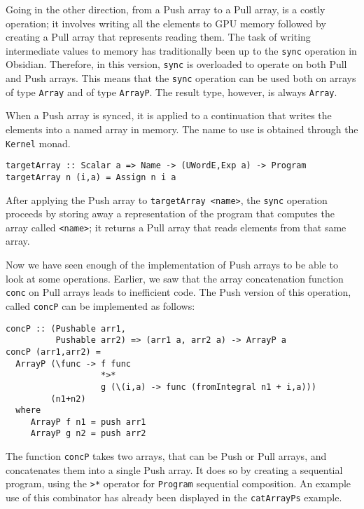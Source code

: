 Going in the other direction, from a Push array to a Pull array, is a 
costly operation; it involves writing all the elements to GPU memory 
followed by creating a Pull array that represents reading them. 
The task of writing intermediate values to memory 
has traditionally been up to the {\tt sync} operation in Obsidian.
Therefore, in this version, {\tt sync} is overloaded to operate on both Pull and 
Push arrays.  This means that the 
{\tt sync} operation can be used both on arrays of type {\tt Array} 
and of type {\tt ArrayP}. The result type, however, is always {\tt Array}. 

When a Push array is synced, it is applied to a continuation that writes the
elements into a named array in memory. The name to use is obtained through the 
{\tt Kernel} monad.  

\begin{codesize}
\begin{verbatim}
targetArray :: Scalar a => Name -> (UWordE,Exp a) -> Program
targetArray n (i,a) = Assign n i a 
\end{verbatim}
\end{codesize}

After applying the Push array to {\tt targetArray <name>}, the {\tt sync}
operation proceeds by storing away a representation of the program that 
computes the array called {\tt <name>}; it returns a Pull array 
that reads elements from that same array. 

Now we have seen enough of the implementation of Push arrays to be able 
to look at some operations. Earlier, we saw that the
array concatenation function
{\tt conc} on Pull arrays leads to inefficient code. The Push 
version of this operation, called {\tt concP} can be implemented 
as follows: 

\begin{codesize}
\begin{verbatim}
concP :: (Pushable arr1,
          Pushable arr2) => (arr1 a, arr2 a) -> ArrayP a     
concP (arr1,arr2) = 
  ArrayP (\func -> f func
                   *>* 
                   g (\(i,a) -> func (fromIntegral n1 + i,a)))
         (n1+n2)
  where 
     ArrayP f n1 = push arr1
     ArrayP g n2 = push arr2
\end{verbatim}
\end{codesize}

\noindent
The function {\tt concP} takes two arrays, that can be Push or Pull arrays, 
and concatenates them into a single Push array. It does so by creating a 
sequential program, using the {\tt *>*} operator for {\tt Program} sequential
composition. An example use of this combinator has already been displayed in 
the {\tt catArrayPs} example. 

